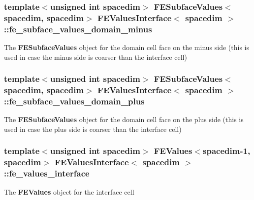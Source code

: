 \subsubsection[{\texorpdfstring{fe\+\_\+subface\+\_\+values\+\_\+domain\+\_\+minus}{fe_subface_values_domain_minus}}]{\setlength{\rightskip}{0pt plus 5cm}template$<$unsigned int spacedim$>$ {\bf F\+E\+Subface\+Values}$<$spacedim, spacedim$>$ {\bf F\+E\+Values\+Interface}$<$ spacedim $>$\+::fe\+\_\+subface\+\_\+values\+\_\+domain\+\_\+minus\hspace{0.3cm}{\ttfamily [private]}}\hypertarget{class_f_e_values_interface_abe003c242c807dd162c396d812bbfe77}{}\label{class_f_e_values_interface_abe003c242c807dd162c396d812bbfe77}
The {\bf F\+E\+Subface\+Values} object for the domain cell face on the minus side (this is used in case the minus side is coarser than the interface cell) 
\subsubsection[{\texorpdfstring{fe\+\_\+subface\+\_\+values\+\_\+domain\+\_\+plus}{fe_subface_values_domain_plus}}]{\setlength{\rightskip}{0pt plus 5cm}template$<$unsigned int spacedim$>$ {\bf F\+E\+Subface\+Values}$<$spacedim, spacedim$>$ {\bf F\+E\+Values\+Interface}$<$ spacedim $>$\+::fe\+\_\+subface\+\_\+values\+\_\+domain\+\_\+plus\hspace{0.3cm}{\ttfamily [private]}}\hypertarget{class_f_e_values_interface_a184e705efd975db536299ad619585a65}{}\label{class_f_e_values_interface_a184e705efd975db536299ad619585a65}
The {\bf F\+E\+Subface\+Values} object for the domain cell face on the plus side (this is used in case the plus side is coarser than the interface cell) 
\subsubsection[{\texorpdfstring{fe\+\_\+values\+\_\+interface}{fe_values_interface}}]{\setlength{\rightskip}{0pt plus 5cm}template$<$unsigned int spacedim$>$ {\bf F\+E\+Values}$<$spacedim-\/1, spacedim$>$ {\bf F\+E\+Values\+Interface}$<$ spacedim $>$\+::fe\+\_\+values\+\_\+interface\hspace{0.3cm}{\ttfamily [private]}}\hypertarget{class_f_e_values_interface_a75f4ee97ebaefa2d1ded52c445953473}{}\label{class_f_e_values_interface_a75f4ee97ebaefa2d1ded52c445953473}
The {\bf F\+E\+Values} object for the interface cell 
